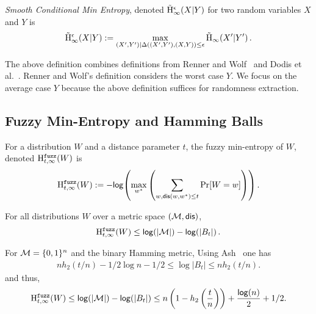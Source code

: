 \begin{definition}
    \emph{Smooth Conditional Min Entropy}, denoted $\tilde{\mathrm{H}}_\infty^\epsilon(X|Y)$ for two random variables $X$ and $Y$ is \[\tilde{\mathrm{H}}_\infty^\epsilon(X|Y):=\max_{(X',Y') | \Delta((X', Y'), (X, Y))\le \epsilon} \tilde{\mathrm{H}}_{\infty}\!\left(X'|Y'\right).
    \] 
\end{definition}

The above definition combines definitions from Renner and Wolf~\cite{renner2005simple} and Dodis et al.~\cite{dodis2008fuzzy}.  Renner and Wolf's definition considers the worst case $Y$.  We focus on the average case $Y$ because the above definition suffices for randomness extraction.






\subsection{Fuzzy Min-Entropy and Hamming Balls}
\begin{definition}

For a distribution $W$ and a distance parameter $t$, the fuzzy min-entropy of $W$, denoted $\mathrm{H}^{\mathtt{fuzz}}_{t,\infty}(W)$ is 
\[
\mathrm{H}^{\mathtt{fuzz}}_{t,\infty}(W):= -\mathsf{log}\!\left( \max_{w^*} \left(\sum_{w, \mathsf{dis}(w, w^*)\le t} \Pr[W=w] \right)\right).
\]
\end{definition}

\begin{proposition} \label{prop:max fuzz ent}
For all distributions $W$ over a metric space $(\mathcal{M}, \mathsf{dis})$, 
\[\mathrm{H}^{\mathtt{fuzz}}_{t,\infty}(W) \le \mathsf{log}\!\left(|\mathcal{M}|\right) - \mathsf{log}\!\left(|B_t|\right).
\]
\end{proposition}
\noindent
For $\mathcal{M} = \{0, 1\}^n$ and the binary Hamming metric,
Using Ash~\cite[Lemma 4.7.2, Equation 4.7.5, p. 115]{ash2012information} one has
\begin{align} nh_2(t/n)  -1/2\log{n} - 1/2 \le \log{|B_t|} \le  nh_2(t/n)\label{eq:size of balls}.\end{align}
and thus, 
\[
\mathrm{H}^{\mathtt{fuzz}}_{t,\infty}(W) \le \mathsf{log}\!\left(|\mathcal{M}|\right) - \mathsf{log}\!\left(|B_t|\right)\le n\left(1-h_2\left(\frac{t}{n}\right)\right)+ \frac{\mathsf{log}\!\left(n\right)}{2} +1/2.
\]

